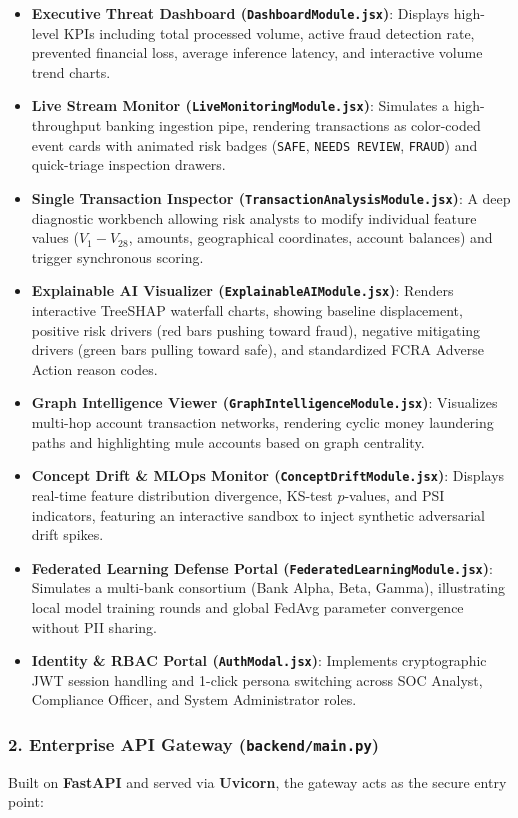\documentclass[12pt,a4paper,oneside]{report}
\begin{document}
\begin{itemize}[leftmargin=0.35in]
\item \textbf{Executive Threat Dashboard (\texttt{DashboardModule.jsx})}: Displays high-level KPIs including total processed volume, active fraud detection rate, prevented financial loss, average inference latency, and interactive volume trend charts.
\item \textbf{Live Stream Monitor (\texttt{LiveMonitoringModule.jsx})}: Simulates a high-throughput banking ingestion pipe, rendering transactions as color-coded event cards with animated risk badges (\texttt{SAFE}, \texttt{NEEDS REVIEW}, \texttt{FRAUD}) and quick-triage inspection drawers.
\item \textbf{Single Transaction Inspector (\texttt{TransactionAnalysisModule.jsx})}: A deep diagnostic workbench allowing risk analysts to modify individual feature values ($V_1-V_{28}$, amounts, geographical coordinates, account balances) and trigger synchronous scoring.
\item \textbf{Explainable AI Visualizer (\texttt{ExplainableAIModule.jsx})}: Renders interactive TreeSHAP waterfall charts, showing baseline displacement, positive risk drivers (red bars pushing toward fraud), negative mitigating drivers (green bars pulling toward safe), and standardized FCRA Adverse Action reason codes.
\item \textbf{Graph Intelligence Viewer (\texttt{GraphIntelligenceModule.jsx})}: Visualizes multi-hop account transaction networks, rendering cyclic money laundering paths and highlighting mule accounts based on graph centrality.
\item \textbf{Concept Drift \& MLOps Monitor (\texttt{ConceptDriftModule.jsx})}: Displays real-time feature distribution divergence, KS-test $p$-values, and PSI indicators, featuring an interactive sandbox to inject synthetic adversarial drift spikes.
\item \textbf{Federated Learning Defense Portal (\texttt{FederatedLearningModule.jsx})}: Simulates a multi-bank consortium (Bank Alpha, Beta, Gamma), illustrating local model training rounds and global FedAvg parameter convergence without PII sharing.
\item \textbf{Identity \& RBAC Portal (\texttt{AuthModal.jsx})}: Implements cryptographic JWT session handling and 1-click persona switching across SOC Analyst, Compliance Officer, and System Administrator roles.
\end{itemize}

\subsubsection{2. Enterprise API Gateway (\texttt{backend/main.py})}
Built on \textbf{FastAPI} and served via \textbf{Uvicorn}, the gateway acts as the secure entry point:
\end{document}
